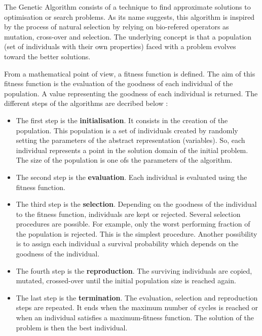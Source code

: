 \documentclass[main.tex]{subfiles}
\begin{document}
\bigskip


\NI The Genetic Algorithm consists of a technique to find approximate solutions to optimisation or search problems. As its name suggests, this algorithm is inspired by the process of natural selection by relying on bio-refered operators as mutation, cross-over and selection. The underlying concept is that a population (set of individuals with their own properties) 
faced with a problem evolves toward the better solutions.


\bigskip


\NI From a mathematical point of view, a fitness function is defined. The aim of this fitness function is the evaluation of the goodness of each individual of the population. A value representing the goodness of each individual is returned. The different steps of the algorithms are decribed below : 


\begin{itemize}
\item The first step is the \textbf{initialisation}. It consists in the creation of the population. This population is a set of individuals created by randomly setting the parameters of the abstract representation (variables). So, each individual represents a point in the solution domain of the initial problem. The size of the population is one ofs the parameters of the algorithm. 

\item The second step is the \textbf{evaluation}. Each individual is evaluated using the fitness function.

\item The third step is the \textbf{selection}. Depending on the goodness of the individual to the fitness function, individuals are kept or rejected. Several selection procedures are possible. For example, only the worst performing fraction of the population is rejected. This is the simplest procedure. Another possibility is to assign each individual a survival probability which depends on the goodness of the individual.

\item The fourth step is the \textbf{reproduction}. The surviving individuals are copied, mutated, crossed-over until the initial population size is reached again.

\item The last step is the \textbf{termination}. The evaluation, selection and reproduction steps are repeated. It ends when the maximum number of cycles is reached or when an individual satisfies a maximum-fitness function. The solution of the problem is then the best individual. 

\end{itemize}  
\end{document}

